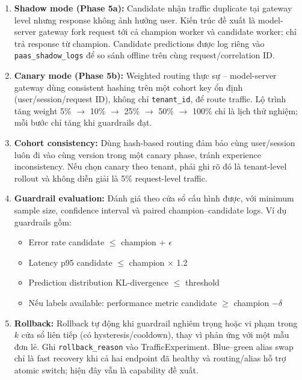 \documentclass[11pt,a4paper]{article}
\newcommand{\codepath}[1]{\texttt{\small #1}}
\begin{document}
\begin{enumerate}
  \item \textbf{Shadow mode (Phase 5a):} Candidate nhận traffic duplicate tại gateway level nhưng response không ảnh hưởng user. Kiến trúc đề xuất là model-server gateway fork request tới cả champion worker và candidate worker; chỉ trả response từ champion. Candidate predictions được log riêng vào \codepath{paas\_shadow\_logs} để so sánh offline trên cùng request/correlation ID.

  \item \textbf{Canary mode (Phase 5b):} Weighted routing thực sự -- model-server gateway dùng consistent hashing trên một cohort key ổn định (user/session/request ID), không chỉ \codepath{tenant\_id}, để route traffic. Lộ trình tăng weight 5\% $\rightarrow$ 10\% $\rightarrow$ 25\% $\rightarrow$ 50\% $\rightarrow$ 100\% chỉ là lịch thử nghiệm; mỗi bước chỉ tăng khi guardrails đạt.

  \item \textbf{Cohort consistency:} Dùng hash-based routing đảm bảo cùng user/session luôn đi vào cùng version trong một canary phase, tránh experience inconsistency. Nếu chọn canary theo tenant, phải ghi rõ đó là tenant-level rollout và không diễn giải là 5\% request-level traffic.

  \item \textbf{Guardrail evaluation:} Đánh giá theo cửa sổ cấu hình được, với minimum sample size, confidence interval và paired champion--candidate logs. Ví dụ guardrails gồm:
  \begin{itemize}
    \item Error rate candidate $\le$ champion + $\epsilon$
    \item Latency p95 candidate $\le$ champion $\times$ 1.2
    \item Prediction distribution KL-divergence $\le$ threshold
    \item Nếu labels available: performance metric candidate $\ge$ champion $- \delta$
  \end{itemize}

  \item \textbf{Rollback:} Rollback tự động khi guardrail nghiêm trọng hoặc vi phạm trong $k$ cửa sổ liên tiếp (có hysteresis/cooldown), thay vì phản ứng với một mẫu đơn lẻ. Ghi \codepath{rollback\_reason} vào TrafficExperiment. Blue--green alias swap chỉ là fast recovery khi cả hai endpoint đã healthy và routing/alias hỗ trợ atomic switch; hiện đây vẫn là capability đề xuất.
\end{enumerate}
\end{document}
